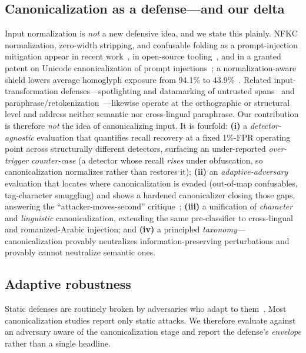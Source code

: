\subsection{Canonicalization as a defense---and our delta}
Input normalization is \emph{not} a new defensive idea, and we state this plainly.
NFKC normalization, zero-width stripping, and confusable folding as a
prompt-injection mitigation appear in recent work~\cite{llmsec2025bypass}, in
open-source tooling~\cite{cleanrepo}, and in a granted patent on Unicode
canonicalization of prompt injections~\cite{patent2025canon}; a
normalization-aware shield lowers average homoglyph exposure from 94.1\% to
43.9\%~\cite{llmsec2025bypass}. Related input-transformation defenses---spotlighting
and datamarking of untrusted spans~\cite{hines2024spotlighting} and
paraphrase/retokenization~\cite{jain2023baseline}---likewise operate at the
orthographic or structural level and address neither semantic nor cross-lingual
paraphrase. Our contribution is therefore \emph{not} the idea
of canonicalizing input. It is fourfold: \textbf{(i)} a \emph{detector-agnostic}
evaluation that quantifies recall recovery at a fixed 1\%-FPR operating point
across structurally different detectors, surfacing an under-reported
\emph{over-trigger counter-case} (a detector whose recall \emph{rises} under
obfuscation, so canonicalization normalizes rather than restores it);
\textbf{(ii)} an \emph{adaptive-adversary} evaluation that locates where
canonicalization is evaded (out-of-map confusables, tag-character smuggling) and
shows a hardened canonicalizer closing those gaps, answering the
``attacker-moves-second'' critique~\cite{attackersecond2025}; \textbf{(iii)} a
unification of \emph{character} and \emph{linguistic} canonicalization, extending
the same pre-classifier to cross-lingual and romanized-Arabic injection; and
\textbf{(iv)} a principled \emph{taxonomy}---canonicalization provably neutralizes
information-preserving perturbations and provably cannot neutralize semantic ones.

\subsection{Adaptive robustness}
Static defenses are routinely broken by adversaries who adapt to
them~\cite{attackersecond2025}. Most canonicalization studies report only static
attacks. We therefore evaluate against an adversary aware of the canonicalization
stage and report the defense's \emph{envelope} rather than a single headline.

